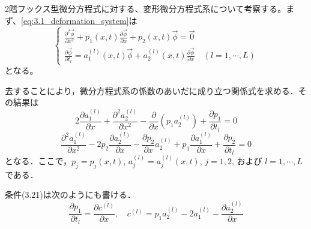 
2階フックス型微分方程式に対する、変形微分方程式系について考察する。まず、\eqref{eq:3.1_deformation_system}は
\begin{equation}
\begin{cases}
\displaystyle \frac{\partial^{2}\vec{\phi}}{\partial x^{2}} + p_{1}(x,t)\frac{\partial\vec{\phi}}{\partial x}+p_{2}(x,t)\vec{\phi} = \vec{0}  \\[1em]
\displaystyle \frac{\partial \vec{\phi}}{\partial t_{l}} = a_{1}^{(l)}(x,t)\vec{\phi}+a_{2}^{(l)}(x,t)\frac{\partial\vec{\phi}}{\partial x} \quad (l=1,\cdots,L)
\end{cases}
\end{equation}
となる。

\begin{story}
去することにより，微分方程式系の係数のあいだに成り立つ関係式を求める．その結果は
\begin{equation}
    2\frac{\partial a_1^{(l)}}{\partial x} + \frac{\partial^2 a_2^{(l)}}{\partial x^2} - \frac{\partial}{\partial x}(p_1 a_2^{(l)}) + \frac{\partial p_1}{\partial t_l} = 0 \label{eq:3.21}
\end{equation}
\begin{equation}
    \frac{\partial^2 a_1^{(l)}}{\partial x^2} - 2p_2\frac{\partial a_2^{(l)}}{\partial x} - \frac{\partial p_2}{\partial x}a_2^{(l)} + p_1\frac{\partial a_1^{(l)}}{\partial x} + \frac{\partial p_2}{\partial t_l} = 0 \label{eq:3.22}
\end{equation}
となる．ここで，$p_j = p_j(x,t)$, $a_j^{(l)} = a_j^{(l)}(x,t)$, $j=1,2$, および $l=1,\cdots,L$ である．

条件(3.21)は次のようにも書ける．
\begin{equation}
    \frac{\partial p_1}{\partial t_l} = \frac{\partial c^{(l)}}{\partial x}, \quad c^{(l)} = p_1 a_2^{(l)} - 2a_1^{(l)} - \frac{\partial a_2^{(l)}}{\partial x} \label{eq:3.23}
\end{equation}


\end{story}
